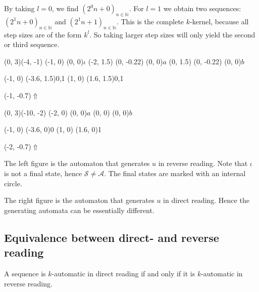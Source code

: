 \documentclass{article}
\begin{document}
By taking $l = 0$, we find $(2^0 n + 0)_{n \in \mathbb{N}}$. For $l = 1$ we
obtain two sequences: $(2^1 n + 0)_{n \in \mathbb{N}}$ and
$(2^1 n + 1)_{n \in \mathbb{N}}$. This is the complete $k$-kernel, because all 
step sizes are of the form $k^l$. So taking larger step sizes will only yield 
the second or third sequence.

\begin{graph}(0, 3)(-4, -1)
  (-1, 0) (0, 0){$\iota$}
  (-2, 1.5)
    (0, -0.22){} (0, 0){$a$}
  (0, 1.5)
    (0, -0.22){} (0, 0){$b$}

   
   
  (-1, 0) \freetext(-3.6, 1.5){0,1}
  (1, 0) \freetext(1.6, 1.5){0,1}

  \freetext(-1, -0.7){$\Uparrow$}
\end{graph}
\begin{graph}(0, 3)(-10, -2)
  (-2, 0) (0, 0){$a$}
  (0, 0)  (0, 0){$b$}

  (-1, 0) \freetext(-3.6, 0){0}
   
   
  (1, 0) \freetext(1.6, 0){1}

  \freetext(-2, -0.7){$\Uparrow$}
\end{graph}

The left figure is the automaton that generates $u$ in reverse reading. Note 
that $\iota$ is not a final state, hence $\mathcal{S} \ne \mathcal{A}$. The 
final states are marked with an internal circle.

The right figure is the automaton that generates $u$ in direct reading. Hence
the generating automata can be essentially different.

\subsection{Equivalence between direct- and reverse reading}
\begin{theorem} \label{thm:direct_is_reverse}
A sequence is $k$-automatic in direct reading if and only if it is 
$k$-automatic in reverse reading.
\end{theorem}
\end{document}

